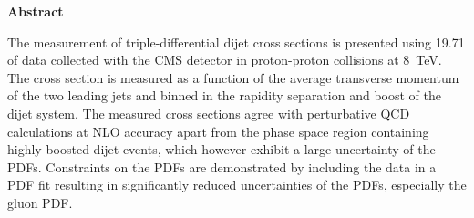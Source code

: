 \thispagestyle{plain}
\begin{center}
    \LARGE{\textbf{Abstract}}\\[2em]
\end{center}
    \normalsize
    The measurement of triple-differential dijet cross sections is presented
    using \SI{19.71}{\fbinv} of data collected with the CMS detector in
    proton-proton collisions at \SI{8}{\TeV}. The cross section is measured as a
    function of the average transverse momentum of the two leading jets and
    binned in the rapidity separation and boost of the dijet system. The
    measured cross sections agree with perturbative QCD calculations at NLO
    accuracy apart from the phase space region containing highly boosted dijet
    events, which however exhibit a large uncertainty of the PDFs. Constraints
    on the PDFs are demonstrated by including the data in a PDF fit resulting in
    significantly reduced uncertainties of the PDFs, especially the gluon PDF.
    \vspace{1ex}


\cleardoublepage

